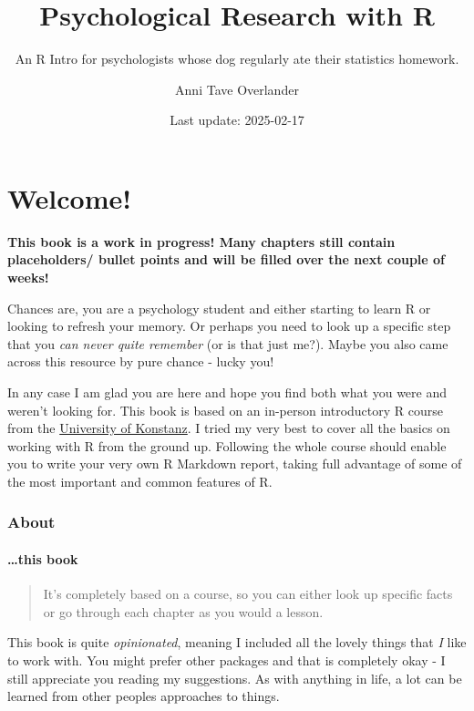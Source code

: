 \documentclass[
]{book}
\title{Psychological Research with R}
\subtitle{An R Intro for psychologists whose dog regularly ate their statistics homework.}
\author{Anni Tave Overlander}
\date{Last update: 2025-02-17}
\begin{document}
\maketitle

{
\setcounter{tocdepth}{1}
\tableofcontents
}
\chapter*{Welcome!}\label{welcome}

\textbf{This book is a work in progress! Many chapters still contain placeholders/ bullet points and will be filled over the next couple of weeks!}

Chances are, you are a psychology student and either starting to learn R or looking to refresh your memory.
Or perhaps you need to look up a specific step that you \emph{can never quite remember} (or is that just me?).
Maybe you also came across this resource by pure chance - lucky you!

In any case I am glad you are here and hope you find both what you were and weren't looking for.
This book is based on an in-person introductory R course from the \href{https://www.uni-konstanz.de/}{University of Konstanz}.
I tried my very best to cover all the basics on working with R from the ground up.
Following the whole course should enable you to write your very own R Markdown report, taking full advantage of some of the most important and common features of R.

\subsection*{About}\label{about}

\subsubsection*{\ldots this book}\label{this-book}

\begin{quote}
It's completely based on a course, so you can either look up specific facts or go through each chapter as you would a lesson.
\end{quote}

This book is quite \emph{opinionated}, meaning I included all the lovely things that \emph{I} like to work with.
You might prefer other packages and that is completely okay - I still appreciate you reading my suggestions.
As with anything in life, a lot can be learned from other peoples approaches to things.
\end{document}
